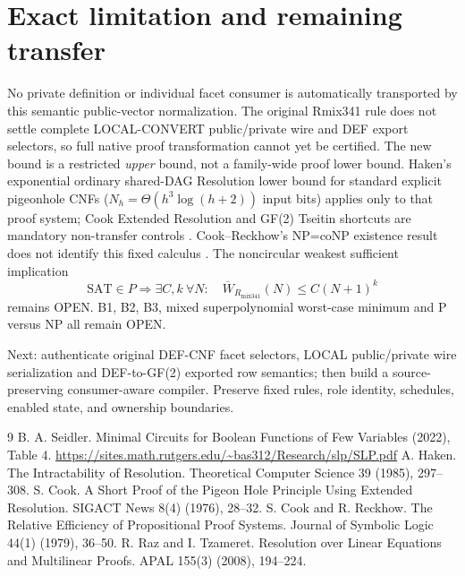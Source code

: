 \documentclass[11pt]{article}
\begin{document}
\section*{Exact limitation and remaining transfer}
\noindent No private definition or individual facet consumer is automatically transported by this semantic public-vector normalization. The original Rmix341 rule does not settle complete LOCAL-CONVERT public/private wire and DEF export selectors, so full native proof transformation cannot yet be certified. The new bound is a restricted \emph{upper} bound, not a family-wide proof lower bound. Haken's exponential ordinary shared-DAG Resolution lower bound for standard explicit pigeonhole CNFs ($N_h=\Theta(h^3\log(h+2))$ input bits) applies only to that proof system; Cook Extended Resolution and GF(2) Tseitin shortcuts are mandatory non-transfer controls \cite{Haken,CookER,Raz}. Cook--Reckhow's NP=coNP existence result does not identify this fixed calculus \cite{CookReckhow}. The noncircular weakest sufficient implication
\[
\mathrm{SAT}\in P\Longrightarrow\exists C,k\ \forall N:\quad \overline W_{R_{\mathrm{mix341}}}(N)\le C(N+1)^k
\]
remains OPEN. B1, B2, B3, mixed superpolynomial worst-case minimum and P versus NP all remain OPEN.

\noindent Next: authenticate original DEF-CNF facet selectors, LOCAL public/private wire serialization and DEF-to-GF(2) exported row semantics; then build a source-preserving consumer-aware compiler. Preserve fixed rules, role identity, schedules, enabled state, and ownership boundaries.
\begin{thebibliography}{9}
 B. A. Seidler. Minimal Circuits for Boolean Functions of Few Variables (2022), Table 4. \url{https://sites.math.rutgers.edu/~bas312/Research/slp/SLP.pdf}
 A. Haken. The Intractability of Resolution. Theoretical Computer Science 39 (1985), 297--308.
 S. Cook. A Short Proof of the Pigeon Hole Principle Using Extended Resolution. SIGACT News 8(4) (1976), 28--32.
 S. Cook and R. Reckhow. The Relative Efficiency of Propositional Proof Systems. Journal of Symbolic Logic 44(1) (1979), 36--50.
 R. Raz and I. Tzameret. Resolution over Linear Equations and Multilinear Proofs. APAL 155(3) (2008), 194--224.
\end{thebibliography}
\end{document}
